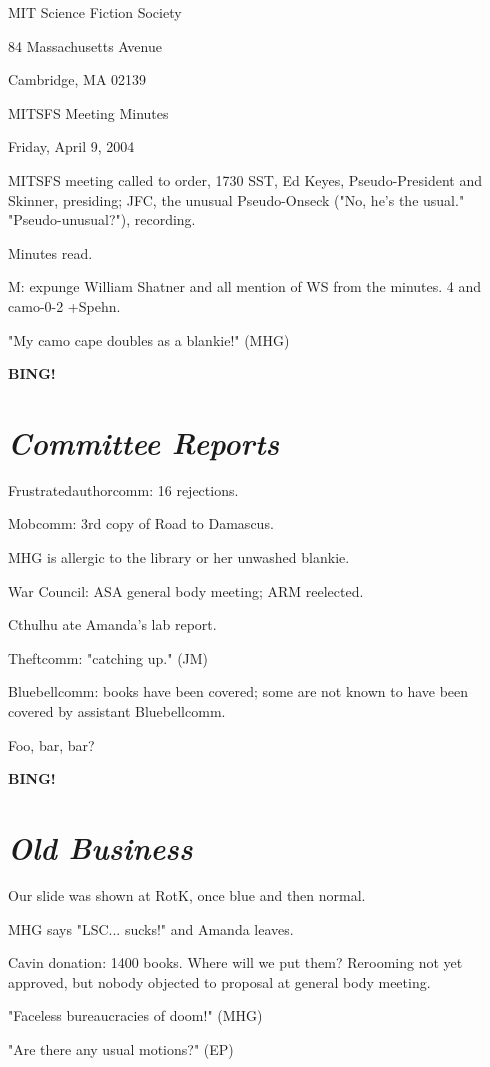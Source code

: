 \documentclass[10pt]{article}
\newcommand{\bing}{{\bf BING!} }
\newcommand{\goto}[1]{\bing \vskip 12pt \section*{{\em{#1}}}}
\begin{document}
\begin{center}

MIT Science Fiction Society 

84 Massachusetts Avenue

Cambridge, MA 02139

\vspace{12pt}

MITSFS Meeting Minutes 

Friday, April 9, 2004

\end{center}
 
\vspace{18pt}

\setlength{\parskip}{6pt}

\noindent
MITSFS meeting called to order, 1730 SST, Ed Keyes, Pseudo-President and Skinner, presiding; JFC, the unusual Pseudo-Onseck ("No, he's the usual." "Pseudo-unusual?"), recording.

Minutes read.

M: expunge William Shatner and all mention of WS from the minutes. 4 and camo-0-2 +Spehn.

"My camo cape doubles as a blankie!" (MHG)

\goto{Committee Reports}

Frustratedauthorcomm: 16 rejections.

Mobcomm: 3rd copy of Road to Damascus.

MHG is allergic to the library or her unwashed blankie.

War Council: ASA general body meeting; ARM reelected.

Cthulhu ate Amanda's lab report.

Theftcomm: "catching up." (JM)

Bluebellcomm: books have been covered; some are not known to have been covered by assistant Bluebellcomm.

Foo, bar, bar?

\goto{Old Business}

Our slide was shown at RotK, once blue and then normal.

MHG says "LSC... sucks!" and Amanda leaves.

Cavin donation: 1400 books. Where will we put them? Rerooming not yet approved, but nobody objected to proposal at general body meeting.

"Faceless bureaucracies of doom!" (MHG)

"Are there any usual motions?" (EP)
\end{document}
